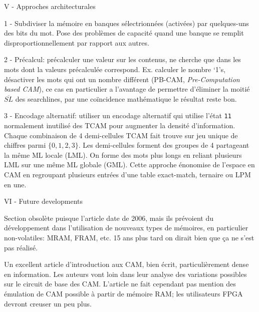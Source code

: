V - Approches architecturales

1 - Subdiviser la mémoire en banques sélectrionnées (activées) par quelques-uns des bits du mot. Pose des problèmes de capacité quand une banque se remplit disproportionnellement par rapport aux autres.

2 - Précalcul: précalculer une valeur sur les contenus, ne cherche que dans les mots dont la valeurs précalculée correspond. Ex. calculer le nombre `1's, désactiver les mots qui ont un nombre différent (PB-CAM, \emph{Pre-Computation based CAM}), ce cas en particulier a l'avantage de permettre d'éliminer la moitié \og $\overline{SL}$ \fg des searchlines, par une coïncidence mathématique le résultat reste bon.

3 - Encodage alternatif: utiliser un encodage alternatif qui utilise l'état \texttt{11} normalement inutilisé des TCAM  pour augmenter la densité d'information. Chaque combinaison de 4 demi-cellules TCAM fait trouve sur jeu unique de chiffres parmi $\{0,1,2,3\}$. Les demi-cellules forment des groupes de 4 partageant la même ML locale (LML). On forme des mots plus longs en reliant plusieurs LML sur une même ML globale (GML). Cette approche énonomise de l'espace en CAM en regroupant plusieurs entrées d'une table exact-match, ternaire ou LPM en une.

VI - Future developments

Section obsolète puisque l'article date de 2006, mais ils prévoient du développement dans l'utilisation de nouveaux types de mémoires, en particulier non-volatiles: MRAM, FRAM, etc. 15 ans plus tard on dirait bien que ça ne s'est pas réalisé.

 Un excellent article d'introduction aux CAM, bien écrit, particulièrement dense en information. Les auteurs vont loin dans leur analyse des variations possibles sur le circuit de base des CAM. L'article ne fait cependant pas mention des émulation de CAM possible à partir de mémoire RAM; les utilisateurs FPGA devront creuser un peu plus.

\clearpage
